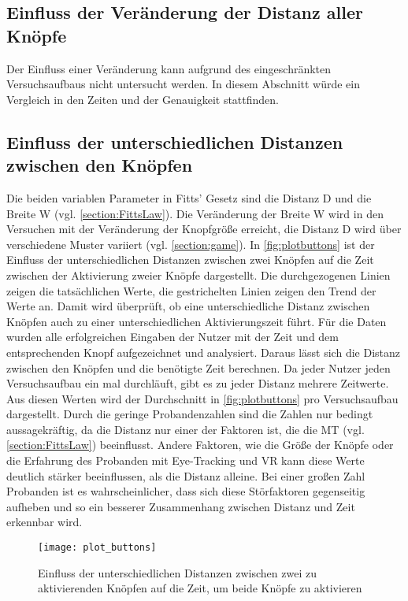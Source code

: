 \subsection{Einfluss der Veränderung der Distanz aller Knöpfe}
Der Einfluss einer Veränderung kann aufgrund des eingeschränkten Versuchsaufbaus nicht untersucht werden. In diesem Abschnitt würde ein Vergleich in den Zeiten und der Genauigkeit stattfinden.

\subsection{Einfluss der unterschiedlichen Distanzen zwischen den Knöpfen}
Die beiden variablen Parameter in Fitts' Gesetz sind die Distanz D und die Breite W (vgl. \autoref{section:FittsLaw}). Die Veränderung der Breite W wird in den Versuchen mit der Veränderung der Knopfgröße erreicht, die Distanz D wird über verschiedene Muster variiert (vgl. \autoref{section:game}). In \autoref{fig:plotbuttons} ist der Einfluss der unterschiedlichen Distanzen zwischen zwei Knöpfen auf die Zeit zwischen der Aktivierung zweier Knöpfe dargestellt. Die durchgezogenen Linien zeigen die tatsächlichen Werte, die gestrichelten Linien zeigen den Trend der Werte an. Damit wird überprüft, ob eine unterschiedliche Distanz zwischen Knöpfen auch zu einer unterschiedlichen Aktivierungszeit führt. Für die Daten wurden alle erfolgreichen Eingaben der Nutzer mit der Zeit und dem entsprechenden Knopf aufgezeichnet und analysiert. Daraus lässt sich die Distanz zwischen den Knöpfen und die benötigte Zeit berechnen. Da jeder Nutzer jeden Versuchsaufbau ein mal durchläuft, gibt es zu jeder Distanz mehrere Zeitwerte. Aus diesen Werten wird der Durchschnitt in \autoref{fig:plotbuttons} pro Versuchsaufbau dargestellt. Durch die geringe Probandenzahlen sind die Zahlen nur bedingt aussagekräftig, da die Distanz nur einer der Faktoren ist, die die \ac{MT} (vgl. \autoref{section:FittsLaw}) beeinflusst. Andere Faktoren, wie die Größe der Knöpfe oder die Erfahrung des Probanden mit Eye-Tracking und VR kann diese Werte deutlich stärker beeinflussen, als die Distanz alleine. Bei einer großen Zahl Probanden ist es wahrscheinlicher, dass sich diese Störfaktoren gegenseitig aufheben und so ein besserer Zusammenhang zwischen Distanz und Zeit erkennbar wird. 
\begin{figure}[!htbp]
	\centering
	\texttt{[image: plot\_buttons]}
	\caption[Einfluss der unterschiedlichen Distanzen zwischen zwei zu aktivierenden Knöpfen auf die Zeit, um beide Knöpfe zu aktivieren]{Einfluss der unterschiedlichen Distanzen zwischen zwei zu aktivierenden Knöpfen auf die Zeit, um beide Knöpfe zu aktivieren}
	\label{fig:plotbuttons}
\end{figure}
